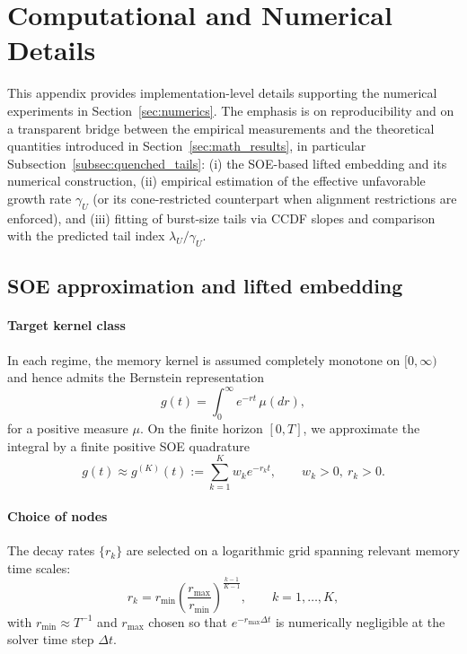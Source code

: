 \documentclass[12pt,a4paper]{article}
\theoremstyle{definition}
\theoremstyle{remark}
\begin{document}
\section{Computational and Numerical Details}
\label{app:computational}

This appendix provides implementation-level details supporting the numerical
experiments in Section~\ref{sec:numerics}. The emphasis is on reproducibility and on
a transparent bridge between the empirical measurements and the theoretical quantities
introduced in Section~\ref{sec:math_results}, in particular Subsection~\ref{subsec:quenched_tails}:
(i) the SOE-based lifted embedding and its numerical construction,
(ii) empirical estimation of the effective unfavorable growth rate $\gamma_U$
(or its cone-restricted counterpart when alignment restrictions are enforced), and
(iii) fitting of burst-size tails via CCDF slopes and comparison with the predicted
tail index $\lambda_U/\gamma_U$.

\subsection{SOE approximation and lifted embedding}
\label{app:soe}

\paragraph{Target kernel class}
In each regime, the memory kernel is assumed completely monotone on $[0,\infty)$ and hence
admits the Bernstein representation
\begin{equation}\label{eq:bernstein_app}
	g(t)=\int_0^\infty e^{-rt}\,\mu(dr),
\end{equation}
for a positive measure $\mu$. On the finite horizon $[0,T]$, we approximate the integral by a finite positive SOE quadrature
\begin{equation}\label{eq:soe_app}
	g(t)\approx g^{(K)}(t):=\sum_{k=1}^K w_k e^{-r_k t},
	\qquad w_k>0,\ r_k>0.
\end{equation}

\paragraph{Choice of nodes}
The decay rates $\{r_k\}$ are selected on a logarithmic grid spanning relevant memory time scales:
\begin{equation}\label{eq:rk_grid_app}
	r_k=r_{\min}\left(\frac{r_{\max}}{r_{\min}}\right)^{\frac{k-1}{K-1}},
	\qquad k=1,\dots,K,
\end{equation}
with $r_{\min}\approx T^{-1}$ and $r_{\max}$ chosen so that $e^{-r_{\max}\Delta t}$ is numerically negligible at the solver time step
$\Delta t$.
\end{document}
